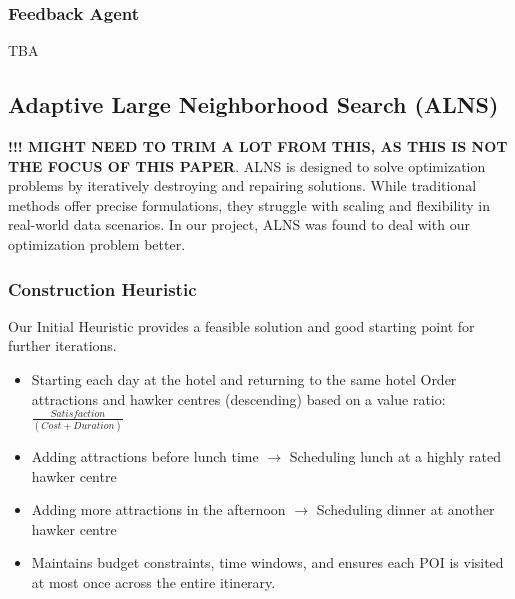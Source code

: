 \documentclass{ecai}
\begin{document}
\subsubsection{Feedback Agent}
TBA

\subsection{Adaptive Large Neighborhood Search (ALNS)}
\textbf{!!! MIGHT NEED TO TRIM A LOT FROM THIS, AS THIS IS NOT THE FOCUS OF THIS PAPER}. ALNS is designed to solve optimization problems by iteratively destroying and repairing solutions. While traditional methods offer precise formulations, they struggle with scaling and flexibility in real-world data scenarios. In our project, ALNS was found to deal with our optimization problem better.

\subsubsection{Construction Heuristic}
Our Initial Heuristic provides a feasible solution and good starting point for further iterations.
\begin{itemize}
	\item Starting each day at the hotel and returning to the same hotel
	Order attractions and hawker centres (descending) based on a value ratio: $\frac{Satisfaction}{(Cost + Duration)}$
	\item Adding attractions before lunch time $\rightarrow$ Scheduling lunch at a highly rated hawker centre
	\item Adding more attractions in the afternoon $\rightarrow$ Scheduling dinner at another hawker centre
	\item Maintains budget constraints, time windows, and ensures each POI is visited at most once across the entire itinerary.
\end{itemize}
\end{document}
